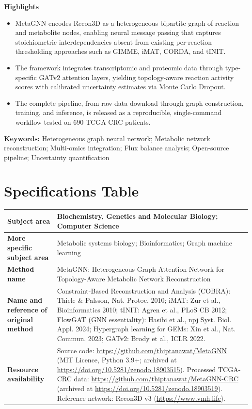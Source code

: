 \documentclass[12pt,a4paper]{article}
\begin{document}
\vspace{0.3cm}
\begin{samepage}
\noindent\textbf{Highlights}
\begin{itemize}
\item MetaGNN encodes Recon3D as a heterogeneous bipartite graph of reaction and metabolite nodes, enabling neural message passing that captures stoichiometric interdependencies absent from existing per-reaction thresholding approaches such as GIMME, iMAT, CORDA, and tINIT.

\item The framework integrates transcriptomic and proteomic data through type-specific GATv2 attention layers, yielding topology-aware reaction activity scores with calibrated uncertainty estimates via Monte Carlo Dropout.

\item The complete pipeline, from raw data download through graph construction, training, and inference, is released as a reproducible, single-command workflow tested on 690 TCGA-CRC patients.
\end{itemize}
\end{samepage}

\noindent\textbf{Keywords:} Heterogeneous graph neural network; Metabolic network reconstruction; Multi-omics integration; Flux balance analysis; Open-source pipeline; Uncertainty quantification

\section*{Specifications Table}

\noindent
\small
\renewcommand{\arraystretch}{1.4}
\begin{tabularx}{\textwidth}{@{}>{\raggedright\arraybackslash}p{3.2cm}X@{}}
\toprule
\textbf{Subject area} & Biochemistry, Genetics and Molecular Biology; Computer Science \\
\midrule
\textbf{More specific subject area} & Metabolic systems biology; Bioinformatics; Graph machine learning \\
\midrule
\textbf{Method name} & MetaGNN: Heterogeneous Graph Attention Network for Topology-Aware Metabolic Network Reconstruction \\
\midrule
\textbf{Name and reference of original method} & Constraint-Based Reconstruction and Analysis (COBRA): Thiele \& Palsson, Nat. Protoc. 2010; iMAT: Zur et al., Bioinformatics 2010; tINIT: Agren et al., PLoS CB 2012; FlowGAT (GNN essentiality): Hasibi et al., npj Syst. Biol. Appl. 2024; Hypergraph learning for GEMs: Xin et al., Nat. Commun. 2023; GATv2: Brody et al., ICLR 2022. \\
\midrule
\textbf{Resource availability} & Source code: \url{https://github.com/thiptanawat/MetaGNN} (MIT Licence, Python 3.9+; archived at \url{https://doi.org/10.5281/zenodo.18903515}). Processed TCGA-CRC data: \url{https://github.com/thiptanawat/MetaGNN-CRC} (archived at \url{https://doi.org/10.5281/zenodo.18903519}). Reference network: Recon3D v3 (\url{https://www.vmh.life}). \\
\bottomrule
\end{tabularx}
\normalsize
\renewcommand{\arraystretch}{1.0}
\end{document}
